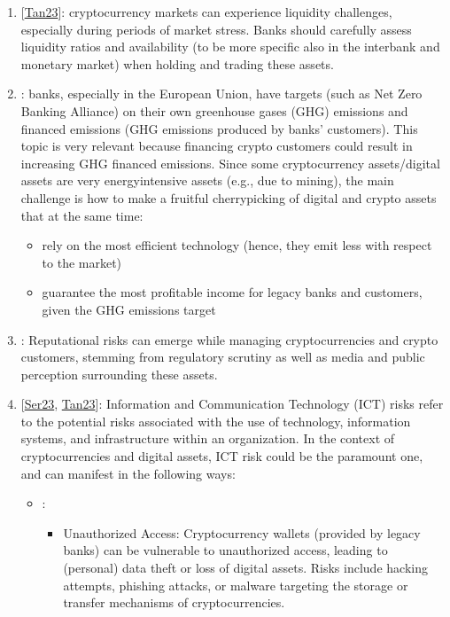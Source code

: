 \documentclass[letterpaper,10pt,english]{jupyterBook}
\begin{document}
\begin{enumerate}
\begin{itemize}
\end{itemize}

\item {} 
\sphinxAtStartPar
{} {[}\hyperlink{cite.ARM/arm:id149}{Tan23}{]}: cryptocurrency markets can experience liquidity challenges, especially during periods of market stress. Banks should carefully assess liquidity ratios and availability (to be more specific also in the interbank and monetary market) when holding and trading these assets.

\item {} 
\sphinxAtStartPar
{}: banks, especially in the European Union, have targets (such as Net Zero Banking Alliance) on their own greenhouse gases (GHG) emissions and financed emissions (GHG emissions produced by banks’ customers). This topic is very relevant because financing crypto customers could result in increasing GHG financed emissions. Since some cryptocurrency assets/digital assets are very energy\sphinxhyphen{}intensive assets (e.g., due to mining), the main challenge is how to make a fruitful cherry\sphinxhyphen{}picking of digital and crypto assets that at the same time:
\begin{itemize}
\item {} 
\sphinxAtStartPar
rely on the most efficient technology (hence, they emit less with respect to the market)

\item {} 
\sphinxAtStartPar
guarantee the most profitable income for legacy banks and customers, given the GHG emissions target

\end{itemize}

\item {} 
\sphinxAtStartPar
{}: Reputational risks can emerge while managing cryptocurrencies and crypto customers, stemming from regulatory scrutiny as well as media and public perception surrounding these assets.

\item {} 
\sphinxAtStartPar
{} {[}\hyperlink{cite.ARM/arm:id148}{Ser23}, \hyperlink{cite.ARM/arm:id149}{Tan23}{]}: Information and Communication Technology (ICT) risks refer to the potential risks associated with the use of technology, information systems, and infrastructure within an organization. In the context of cryptocurrencies and digital assets, ICT risk could be the paramount one, and can manifest in the following ways:
\begin{itemize}
\item {} 
\sphinxAtStartPar
{}:
\begin{itemize}
\item {} 
\sphinxAtStartPar
Unauthorized Access: Cryptocurrency wallets (provided by legacy banks) can be vulnerable to unauthorized access, leading to (personal) data theft or loss of digital assets. Risks include hacking attempts, phishing attacks, or malware targeting the storage or transfer mechanisms of cryptocurrencies.


\end{itemize}
\end{itemize}
\end{enumerate}
\end{document}
